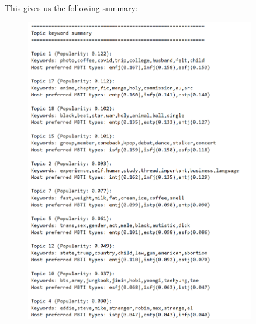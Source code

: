 \documentclass[12pt]{article}
\numberwithin{figure}{section}  %
\begin{document}
	 This gives us the following summary:
	 \begin{figure}[H]
	 		\centering
	 		\includegraphics[width=0.9\textwidth]{Q2topsum} 	
	 \end{figure}
	 
\end{document}
